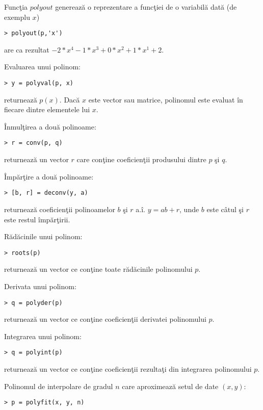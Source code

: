 \documentclass{exam}
\begin{document}
Funcţia $polyout$ generează o reprezentare a funcţiei de o variabilă dată (de exemplu $x$)
\begin{verbatim}
> polyout(p,'x')
\end{verbatim}

\noindent  are ca rezultat $ -2*x^4 - 1*x^3 + 0*x^2 + 1*x^1 + 2$.

Evaluarea unui polinom:
\begin{verbatim}
> y = polyval(p, x)
\end{verbatim}

\noindent  returnează $p(x)$. Dacă $x$ este vector sau matrice, polinomul este evaluat în fiecare dintre elementele lui $x$.

Înmulţirea a două polinoame:
\begin{verbatim}
> r = conv(p, q)
\end{verbatim}

\noindent  returnează un vector $r$ care conţine coeficienţii produsului dintre $p$ şi $q$.

Împărţire a două polinoame:
\begin{verbatim}
> [b, r] = deconv(y, a)
\end{verbatim}

\noindent returnează coeficienţii polinoamelor $b$ şi $r$ a.î. $y=ab+r$, unde $b$ este câtul şi $r$ este restul împărţirii.

Rădăcinile unui polinom:
\begin{verbatim}
> roots(p)
\end{verbatim}

\noindent returnează un vector ce conţine toate rădăcinile polinomului $p$.

Derivata  unui polinom:
\begin{verbatim}
> q = polyder(p)
\end{verbatim}

\noindent returnează un vector ce conţine coeficienţii derivatei polinomului $p$.

Integrarea  unui polinom:
\begin{verbatim}
> q = polyint(p)
\end{verbatim}

\noindent returnează un vector ce conţine coeficienţii rezultaţi din integrarea polinomului $p$.

Polinomul de interpolare de gradul $n$ care aproximează setul de date $(x,y)$:
\begin{verbatim}
> p = polyfit(x, y, n)
\end{verbatim}
\end{document}
